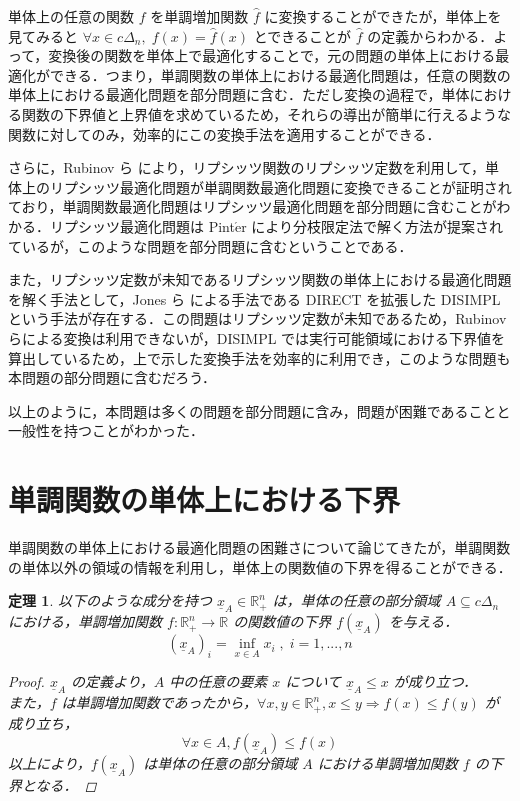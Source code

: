 \documentclass[a4paper,11pt]{jreport}
\newtheorem{theorem}{定理}
\begin{document}
単体上の任意の関数 $ f $ を単調増加関数 $ \hat{f} $ に変換することができたが，単体上を見てみると $ \forall x \in c \Delta_n, \; f(x) = \hat{f}(x) $ とできることが $ \hat{f} $ の定義からわかる．よって，変換後の関数を単体上で最適化することで，元の問題の単体上における最適化ができる．つまり，単調関数の単体上における最適化問題は，任意の関数の単体上における最適化問題を部分問題に含む．ただし変換の過程で，単体における関数の下界値と上界値を求めているため，それらの導出が簡単に行えるような関数に対してのみ，効率的にこの変換手法を適用することができる．\par
さらに，Rubinov ら \cite{rubinov} により，リプシッツ関数のリプシッツ定数を利用して，単体上のリプシッツ最適化問題が単調関数最適化問題に変換できることが証明されており，単調関数最適化問題はリプシッツ最適化問題を部分問題に含むことがわかる．リプシッツ最適化問題は Pint$\acute{\mbox{e}}$r \cite{pinter} により分枝限定法で解く方法が提案されているが，このような問題を部分問題に含むということである．\par
また，リプシッツ定数が未知であるリプシッツ関数の単体上における最適化問題を解く手法として，Jones ら \cite{direct} による手法である DIRECT を拡張した DISIMPL \cite{disimpl} という手法が存在する．この問題はリプシッツ定数が未知であるため，Rubinov らによる変換は利用できないが，DISIMPL では実行可能領域における下界値を算出しているため，上で示した変換手法を効率的に利用でき，このような問題も本問題の部分問題に含むだろう．\par
以上のように，本問題は多くの問題を部分問題に含み，問題が困難であることと一般性を持つことがわかった．

\section{単調関数の単体上における下界} \label{sec:lower_bound_of_monotonic_function_on_simplex}

単調関数の単体上における最適化問題の困難さについて論じてきたが，単調関数の単体以外の領域の情報を利用し，単体上の関数値の下界を得ることができる．

\begin{theorem}\label{thm:lower_bound_of_monotonic_function}
以下のような成分を持つ $ \underline{x}_A \in \mathbb{R}^n_{+} $ は，単体の任意の部分領域 $ A \subseteq c \Delta_n $ における，単調増加関数 $ f :  \mathbb{R}^n_{+} \to \mathbb{R} $ の関数値の下界 $ f(\underline{x}_A) $ を与える．
$$ \left( \underline{x}_A \right)_i = \inf_{x \in A } x_i \; , \; i = 1, ..., n $$

\begin{proof}
$ \underline{x}_A $ の定義より，$ A $ 中の任意の要素 $ x $ について $ \underline{x}_A \leq x $ が成り立つ．\\
また，$ f $ は単調増加関数であったから，$ \forall x, y \in \mathbb{R}^n_{+}, x \leq y \Rightarrow f(x) \leq f(y) $ が成り立ち，
$$ \forall x \in A, f(\underline{x}_A) \leq f(x) $$
以上により，$ f(\underline{x}_A) $ は単体の任意の部分領域 $ A $ における単調増加関数 $ f $ の下界となる．
\end{proof}

\end{theorem}
\end{document}
